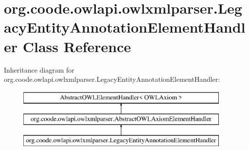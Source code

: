 \hypertarget{classorg_1_1coode_1_1owlapi_1_1owlxmlparser_1_1_legacy_entity_annotation_element_handler}{\section{org.\-coode.\-owlapi.\-owlxmlparser.\-Legacy\-Entity\-Annotation\-Element\-Handler Class Reference}
\label{classorg_1_1coode_1_1owlapi_1_1owlxmlparser_1_1_legacy_entity_annotation_element_handler}
}
Inheritance diagram for org.\-coode.\-owlapi.\-owlxmlparser.\-Legacy\-Entity\-Annotation\-Element\-Handler\-:\begin{figure}[H]
\begin{center}
\leavevmode
\includegraphics[height=3.000000cm]{classorg_1_1coode_1_1owlapi_1_1owlxmlparser_1_1_legacy_entity_annotation_element_handler}
\end{center}
\end{figure}
